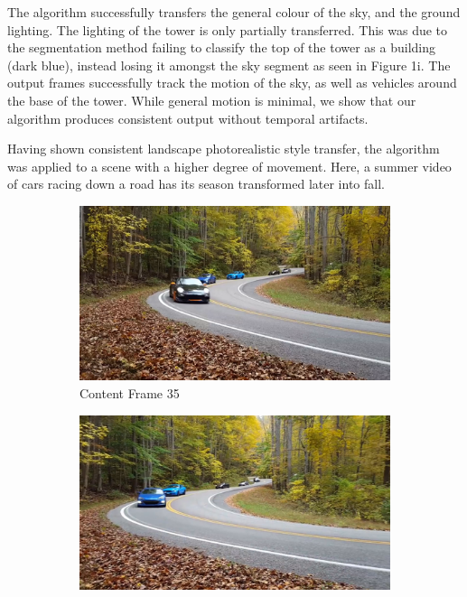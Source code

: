 \documentclass[runningheads]{llncs}
\begin{document}
The algorithm successfully transfers the general colour of the sky, and the ground lighting. The lighting of the tower is only partially transferred. This was due to the segmentation method failing to classify the top of the tower as a building (dark blue), instead losing it amongst the sky segment as seen in Figure 1i. The output frames successfully track the motion of the sky, as well as vehicles around the base of the tower. While general motion is minimal, we show that our algorithm produces consistent output without temporal artifacts.

Having shown consistent landscape photorealistic style transfer, the algorithm was applied to a scene with a higher degree of movement. Here, a summer video of cars racing down a road has its season transformed later into fall.
\begin{figure}[h!]
\centering
\begin{subfigure}[t]{0.3\linewidth}
    \centering
    \includegraphics[width=1\linewidth]{cars/small_0035.png}
    \caption{Content Frame 35}
\end{subfigure}
\begin{subfigure}[t]{0.3\linewidth}
    \centering
    \includegraphics[width=1\linewidth]{cars/small_0054.png}

\end{subfigure}
\end{figure}
\end{document}
